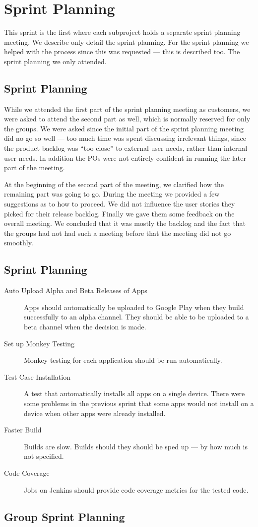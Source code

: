 \chapter{Sprint Planning}
This sprint is the first where each subproject holds a separate sprint planning meeting. We describe only detail the \bd sprint planning. For the \db sprint planning we helped with the process since this was requested --- this is described too. The \gui sprint planning we only attended.

\section{\db Sprint Planning}
While we attended the first part of the \db sprint planning meeting as customers, we were asked to attend the second part as well, which is normally reserved for only the \db groups. We were asked since the initial part of the sprint planning meeting did no go so well --- too much time was spent discussing irrelevant things, since the product backlog was ``too close'' to external user needs, rather than internal user needs. In addition the \db POs were not entirely confident in running the later part of the meeting.

At the beginning of the second part of the meeting, we clarified how the remaining part was going to go. During the meeting we provided a few suggestions as to how to proceed. We did not influence the user stories they picked for their release backlog. Finally we gave them some feedback on the overall meeting. We concluded that it was mostly the backlog and the fact that the \db groups had not had such a meeting before that the meeting did not go smoothly.

\section{\bd Sprint Planning}

\begin{description}
  \item[Auto Upload Alpha and Beta Releases of Apps] Apps should automatically be uploaded to Google Play when they build successfully to an alpha channel. They should be able to be uploaded to a beta channel when the decision is made.
  \item[Set up Monkey Testing] Monkey testing for each application should be run automatically.
  \item[Test Case Installation] A test that automatically installs all apps on a single device. There were some problems in the previous sprint that some apps would not install on a device when other apps were already installed.
  \item[Faster Build] Builds are slow. Builds should they should be sped up --- by how much is not specified.
  \item[Code Coverage] Jobs on Jenkins should provide code coverage metrics for the tested code.
\end{description}

\section{Group Sprint Planning}
\dummy